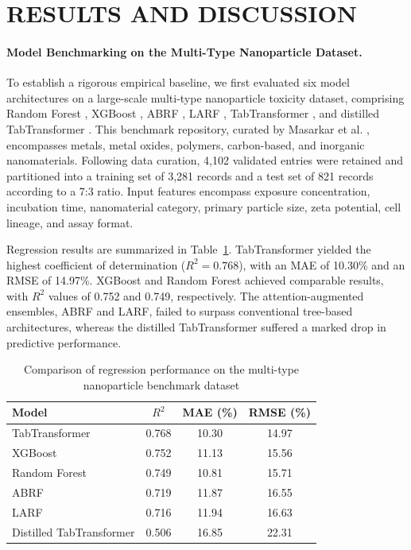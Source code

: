 \documentclass[letterpaper]{article}
\begin{document}
\section{RESULTS AND DISCUSSION}

\paragraph{Model Benchmarking on the Multi-Type Nanoparticle Dataset.}
To establish a rigorous empirical baseline, we first evaluated six model architectures on a large-scale multi-type nanoparticle toxicity dataset, comprising Random Forest \cite{breiman2001random}, XGBoost \cite{chen2016xgboost}, ABRF \cite{gromov2022attention}, LARF \cite{gromov2022larf}, TabTransformer \cite{huang2020tabtransformer}, and distilled TabTransformer \cite{hinton2015distilling}. This benchmark repository, curated by Masarkar et al. \cite{masarkar2024}, encompasses metals, metal oxides, polymers, carbon-based, and inorganic nanomaterials. Following data curation, 4,102 validated entries were retained and partitioned into a training set of 3,281 records and a test set of 821 records according to a 7:3 ratio. Input features encompass exposure concentration, incubation time, nanomaterial category, primary particle size, zeta potential, cell lineage, and assay format.

Regression results are summarized in Table~\ref{tab:benchmark_regression}. TabTransformer yielded the highest coefficient of determination ($R^2 = 0.768$), with an MAE of 10.30\% and an RMSE of 14.97\%. XGBoost and Random Forest achieved comparable results, with $R^2$ values of 0.752 and 0.749, respectively. The attention-augmented ensembles, ABRF and LARF, failed to surpass conventional tree-based architectures, whereas the distilled TabTransformer suffered a marked drop in predictive performance.

\begin{table}[htbp]
  \centering
  \caption{Comparison of regression performance on the multi-type nanoparticle benchmark dataset}
  \label{tab:benchmark_regression}
  \begin{tabular}{lccc}
    \hline
    Model & $R^2$ & MAE (\%) & RMSE (\%) \\
    \hline
    TabTransformer & 0.768 & 10.30 & 14.97 \\
    XGBoost & 0.752 & 11.13 & 15.56 \\
    Random Forest & 0.749 & 10.81 & 15.71 \\
    ABRF & 0.719 & 11.87 & 16.55 \\
    LARF & 0.716 & 11.94 & 16.63 \\
    Distilled TabTransformer & 0.506 & 16.85 & 22.31 \\
    \hline
  \end{tabular}
\end{table}
\end{document}
